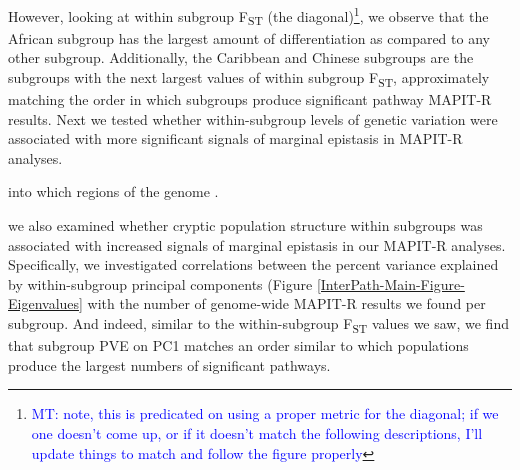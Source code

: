 \documentclass[12pt,a4paper]{article}
\def\log{{\rm log}}
\begin{document}


However, looking at within subgroup F\textsubscript{ST} (the diagonal)\footnote{\textcolor{blue}{MT: note, this is predicated on using a proper metric for the diagonal; if we one doesn't come up, or if it doesn't match the following descriptions, I'll update things to match and follow the figure properly}}, we observe that the African subgroup has the largest amount of differentiation as compared to any other subgroup. Additionally, the Caribbean and Chinese subgroups are the subgroups with the next largest values of within subgroup F\textsubscript{ST}, approximately matching the order in which subgroups produce significant pathway MAPIT-R results. Next we tested whether within-subgroup levels of genetic variation were associated with more significant signals of marginal epistasis in MAPIT-R analyses.


into which regions of the genome . 

we also examined whether cryptic population structure within subgroups was associated with increased signals of marginal epistasis in our MAPIT-R analyses. Specifically, we investigated correlations between the percent variance explained by within-subgroup principal components (Figure \ref{InterPath-Main-Figure-Eigenvalues} with the number of genome-wide MAPIT-R results we found per subgroup. And indeed, similar to the within-subgroup F\textsubscript{ST} values we saw, we find that subgroup PVE on PC1 matches an order similar to which populations produce the largest numbers of significant pathways.

\fi
\end{document}
